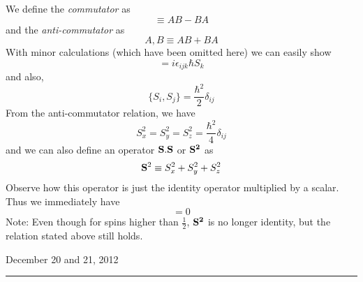 \documentclass[12pt]{article}
\begin{document}
				We define the \emph{commutator} as
				\begin{equation}
					[A,B] \equiv AB - BA
				\end{equation}
				and the \emph{anti-commutator} as
				\begin{equation}
					{A,B} \equiv AB + BA
				\end{equation}
				With minor calculations (which have been omitted here) we can easily show
				\begin{equation}
					[S_i,S_j] = i \epsilon_{ijk} \hbar S_k
				\end{equation}
				and also,
				\begin{equation}
					\{ S_i,S_j \} = \frac {\hbar^2} 2 \delta_{ij}
				\end{equation}
				From the anti-commutator relation, we have 
				\begin{equation}
					S_x^2 = S_y^2 = S_z^2 = \frac {\hbar^2} 4 \delta_{ij}
				\end{equation}
				and we can also define an operator $\bf S.S$ or $\bf S^2$ as
				\begin{equation}
					{\bf S}^2 \equiv S_x^2 + S_y^2 +S_z^2
				\end{equation}
				Observe how this operator is just the identity operator multiplied by a scalar. Thus we immediately have
				\begin{equation}
					[{\bf S}^2, S_i] = 0
				\end{equation}
				Note: Even though for spins higher than $\frac 1 2$, $\bf S^2$ is no longer identity, but the relation stated above still holds.
				\begin{flushright} December 20 and 21, 2012\end{flushright}
				
\vspace{12pt}
\hrule
\end{document}
